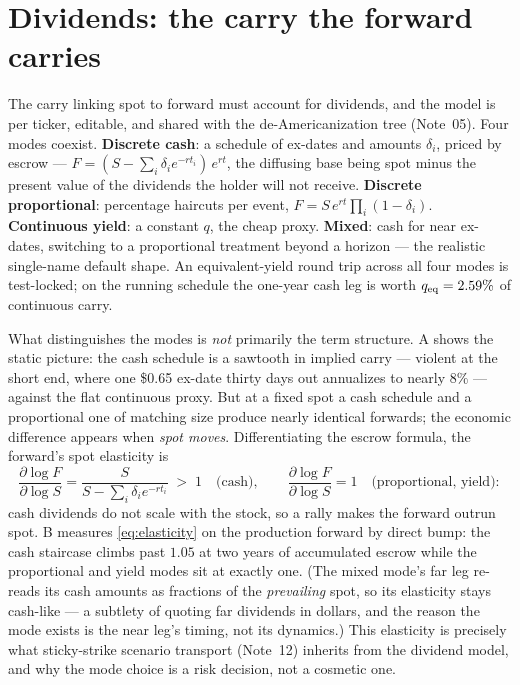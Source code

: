 \documentclass[11pt]{article}
\begin{document}
\section{Dividends: the carry the forward carries}
\label{sec:divs}

The carry linking spot to forward must account for dividends, and the
model is per ticker, editable, and shared with the de-Americanization
tree (Note~05).  Four modes coexist.  \textbf{Discrete cash}: a schedule
of ex-dates and amounts $\delta_i$, priced by escrow ---
$F=(S-\sum_i\delta_ie^{-rt_i})\,e^{rt}$, the diffusing base being spot
minus the present value of the dividends the holder will not receive.
\textbf{Discrete proportional}: percentage haircuts per event,
$F=S\,e^{rt}\prod_i(1-\delta_i)$.  \textbf{Continuous yield}: a constant
$q$, the cheap proxy.  \textbf{Mixed}: cash for near ex-dates, switching
to a proportional treatment beyond a horizon --- the realistic
single-name default shape.  An equivalent-yield round trip across all
four modes is test-locked; on the running schedule the one-year cash leg
is worth $q_{\mathrm{eq}}=2.59\%$ of continuous carry.

What distinguishes the modes is \emph{not} primarily the term structure.
A shows the static picture: the cash schedule is a
sawtooth in implied carry --- violent at the short end, where one \$0.65
ex-date thirty days out annualizes to nearly $8\%$ --- against the flat
continuous proxy.  But at a fixed spot a cash schedule and a
proportional one of matching size produce nearly identical forwards; the
economic difference appears when \emph{spot moves}.  Differentiating the
escrow formula, the forward's spot elasticity is
\begin{equation}
\frac{\partial\log F}{\partial\log S}
=\frac{S}{S-\sum_i\delta_ie^{-rt_i}}\;>\;1
\quad\text{(cash)},\qquad
\frac{\partial\log F}{\partial\log S}=1\quad\text{(proportional, yield)}:
\label{eq:elasticity}
\end{equation}
cash dividends do not scale with the stock, so a rally makes the forward
outrun spot.  B measures \eqref{eq:elasticity} on the
production forward by direct bump: the cash staircase climbs past $1.05$
at two years of accumulated escrow while the proportional and yield modes
sit at exactly one.  (The mixed mode's far leg re-reads its cash amounts
as fractions of the \emph{prevailing} spot, so its elasticity stays
cash-like --- a subtlety of quoting far dividends in dollars, and the
reason the mode exists is the near leg's timing, not its dynamics.)  This
elasticity is precisely what sticky-strike scenario transport
(Note~12) inherits from the dividend model, and why the mode choice is a
risk decision, not a cosmetic one.
\end{document}
